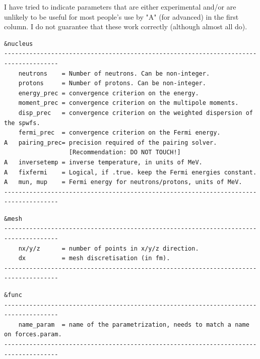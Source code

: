 \documentclass[print,amsmath,amssymb,aps,prc,nofootinbib,notitlepage]{revtex4-1}
\begin{document}
I have tried to indicate parameters that are either experimental and/or are unlikely
to be useful for most people's use by "A" (for advanced) in the first column. I 
do not guarantee that these work correctly (although almost all do).

\begin{Verbatim}
&nucleus 
-------------------------------------------------------------------------------------
    neutrons    = Number of neutrons. Can be non-integer.
    protons     = Number of protons. Can be non-integer.
    energy_prec = convergence criterion on the energy.
    moment_prec = convergence criterion on the multipole moments.
    disp_prec   = convergence criterion on the weighted dispersion of the spwfs.
    fermi_prec  = convergence criterion on the Fermi energy.
A   pairing_prec= precision required of the pairing solver. 
                  [Recommendation: DO NOT TOUCH!]
A   inversetemp = inverse temperature, in units of MeV.
A   fixfermi    = Logical, if .true. keep the Fermi energies constant.
A   mun, mup    = Fermi energy for neutrons/protons, units of MeV.
-------------------------------------------------------------------------------------
\end{Verbatim}

\begin{Verbatim}
&mesh
-------------------------------------------------------------------------------------
    nx/y/z      = number of points in x/y/z direction.
    dx          = mesh discretisation (in fm).
-------------------------------------------------------------------------------------
\end{Verbatim}

\begin{Verbatim}
&func
-------------------------------------------------------------------------------------
    name_param  = name of the parametrization, needs to match a name on forces.param.
-------------------------------------------------------------------------------------
\end{Verbatim}
\end{document}
